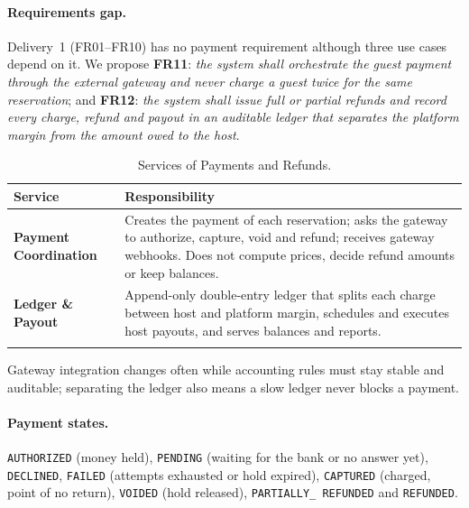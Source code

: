 \paragraph{Requirements gap.} Delivery~1 (FR01--FR10) has no payment
requirement although three use cases depend on it. We propose \textbf{FR11}:
\emph{the system shall orchestrate the guest payment through the external
gateway and never charge a guest twice for the same reservation}; and
\textbf{FR12}: \emph{the system shall issue full or partial refunds and record
every charge, refund and payout in an auditable ledger that separates the
platform margin from the amount owed to the host}.

\begin{longtable}{@{}L{3.0cm}L{10.8cm}@{}}
\toprule
\textbf{Service} & \textbf{Responsibility} \\
\midrule
\endhead
\textbf{Payment Coordination} &
  Creates the payment of each reservation; asks the gateway to authorize,
  capture, void and refund; receives gateway webhooks. Does not compute prices,
  decide refund amounts or keep balances. \\
\addlinespace
\textbf{Ledger \& Payout} &
  Append-only double-entry ledger that splits each charge between host and
  platform margin, schedules and executes host payouts, and serves balances
  and reports. \\
\bottomrule
\caption{Services of Payments and Refunds.}
\label{tab:pay-services}
\end{longtable}

Gateway integration changes often while accounting rules must stay stable and
auditable; separating the ledger also means a slow ledger never blocks a
payment.

\paragraph{Payment states.} \texttt{AUTHORIZED} (money held), \texttt{PENDING}
(waiting for the bank or no answer yet), \texttt{DECLINED}, \texttt{FAILED}
(attempts exhausted or hold expired), \texttt{CAPTURED} (charged, point of no
return), \texttt{VOIDED} (hold released), \texttt{PARTIALLY\_\allowbreak
REFUNDED} and \texttt{REFUNDED}.


